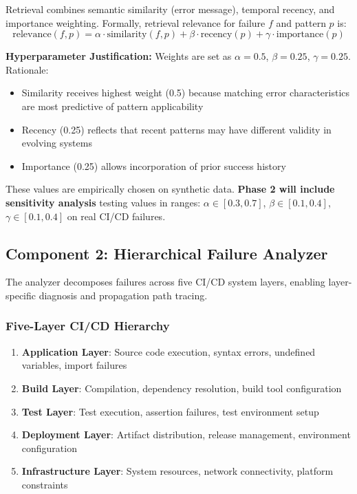 \documentclass[11pt]{article}
\begin{document}
Retrieval combines semantic similarity (error message), temporal recency, and importance weighting. Formally, retrieval relevance for failure $f$ and pattern $p$ is:
\begin{equation}
\text{relevance}(f, p) = \alpha \cdot \text{similarity}(f, p) + \beta \cdot \text{recency}(p) + \gamma \cdot \text{importance}(p)
\end{equation}

\textbf{Hyperparameter Justification:} Weights are set as $\alpha=0.5$, $\beta=0.25$, $\gamma=0.25$. Rationale:
\begin{itemize}
    \item Similarity receives highest weight (0.5) because matching error characteristics are most predictive of pattern applicability
    \item Recency (0.25) reflects that recent patterns may have different validity in evolving systems
    \item Importance (0.25) allows incorporation of prior success history
\end{itemize}

These values are empirically chosen on synthetic data. \textbf{Phase 2 will include sensitivity analysis} testing values in ranges: $\alpha \in [0.3, 0.7]$, $\beta \in [0.1, 0.4]$, $\gamma \in [0.1, 0.4]$ on real CI/CD failures.

\subsection{Component 2: Hierarchical Failure Analyzer}

The analyzer decomposes failures across five CI/CD system layers, enabling layer-specific diagnosis and propagation path tracing.

\subsubsection{Five-Layer CI/CD Hierarchy}

\begin{enumerate}
    \item \textbf{Application Layer}: Source code execution, syntax errors, undefined variables, import failures
    \item \textbf{Build Layer}: Compilation, dependency resolution, build tool configuration
    \item \textbf{Test Layer}: Test execution, assertion failures, test environment setup
    \item \textbf{Deployment Layer}: Artifact distribution, release management, environment configuration
    \item \textbf{Infrastructure Layer}: System resources, network connectivity, platform constraints
\end{enumerate}
\end{document}
